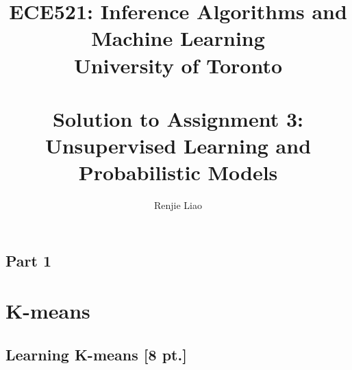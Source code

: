 \documentclass[12pt,letterpaper]{article}
\begin{document}
\title{\vspace{-4ex}ECE521: Inference Algorithms and Machine Learning \\
University of Toronto\\ \  \\
Solution to Assignment 3: \\Unsupervised Learning and Probabilistic Models}
\author{Renjie Liao}


\maketitle

\begin{mycomments}
\section{Part 1}
\end{mycomments}
\section{K-means}

\subsection{Learning K-means [8 pt.]}
\end{document}
